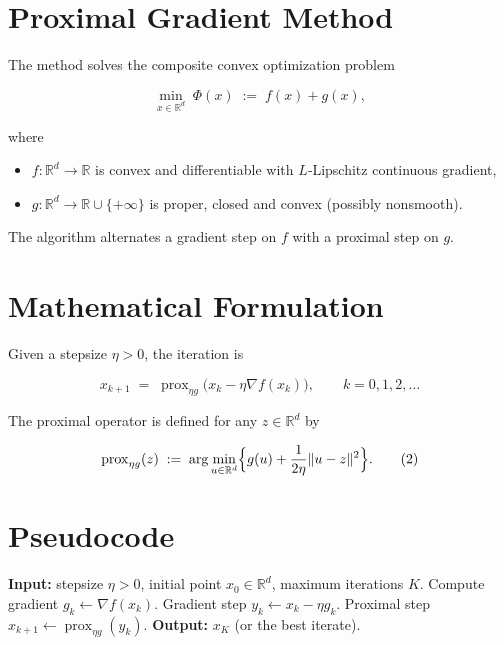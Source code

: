 \documentclass{article}
\begin{document}
\section*{Proximal Gradient Method}

The method solves the composite convex optimization problem  

\[
\min_{x\in\mathbb{R}^d}\; \Phi(x)\;:=\;f(x)+g(x),
\tag{P}
\]

where  

\begin{itemize}
  \item $f:\mathbb{R}^d\to\mathbb{R}$ is convex and differentiable with $L$‑Lipschitz continuous gradient,
  \item $g:\mathbb{R}^d\to\mathbb{R}\cup\{+\infty\}$ is proper, closed and convex (possibly nonsmooth).
\end{itemize}

The algorithm alternates a gradient step on $f$ with a proximal step on $g$.

\section*{Mathematical Formulation}

Given a stepsize $\eta>0$, the iteration is  

\[
x_{k+1}\;=\;\operatorname{prox}_{\eta g}\!\bigl(x_k-\eta\nabla f(x_k)\bigr),\qquad k=0,1,2,\dots
\tag{1}
\]

The proximal operator is defined for any $z\in\mathbb{R}^d$ by  

\[
\operatorname{prox}_{\eta g}(z)\;:=\;\arg\min_{u\in\mathbb{R}^d}\Bigl\{ g(u)+\frac{1}{2\eta}\|u-z\|^2\Bigr\}.
\tag{2}
\]

\section*{Pseudocode}

\begin{algorithm}[H]
\caption{Proximal Gradient Method}
\begin{algorithmic}[1]
\STATE \textbf{Input:} stepsize $\eta>0$, initial point $x_0\in\mathbb{R}^d$, maximum iterations $K$.
\STATE Compute gradient $g_k\gets\nabla f(x_k)$.
\STATE Gradient step $y_k\gets x_k-\eta g_k$.
\STATE Proximal step $x_{k+1}\gets\operatorname{prox}_{\eta g}(y_k)$.
\ENDFOR
\STATE \textbf{Output:} $x_K$ (or the best iterate).
\end{algorithmic}
\end{algorithm}
\end{document}
